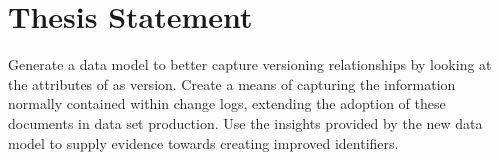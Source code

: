\section{Thesis Statement}

Generate a data model to better capture versioning relationships by looking at the attributes of as version.
Create a means of capturing the information normally contained within change logs, extending the adoption of these documents in data set production.
Use the insights provided by the new data model to supply evidence towards creating improved identifiers.


